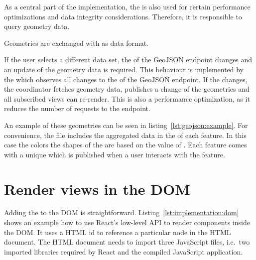 As a central part of the implementation, the  is also used for certain performance optimizations and data integrity considerations.
Therefore, it is responsible to query geometry data.

Geometries are exchanged with \footnotemark as data format.

If the user selects a different data set, the  of the GeoJSON endpoint changes and an update of the geometry data is required.
This behaviour is implemented by the  which observes all changes to the  of the GeoJSON endpoint.
If the  changes, the coordinator fetches geometry data, publishes a change of the geometries and all subscribed views can re-render.
This is also a performance optimization, as it reduces the number of requests to the  endpoint.

An example of these geometries can be seen in listing~\ref{lst:geojson:example}.
For convenience, the file includes the aggregated data in the  of each feature.
In this case the colors the shapes of the \tmap{} are based on the value of .
Each feature comes with a unique  which is published when a user interacts with the feature.



\section{Render views in the DOM}

Adding the \gv{} to the DOM is straightforward.
Listing~\ref{lst:implementation:dom} shows an example how to use React's low-level API to render components inside the DOM.
It uses a HTML id  to reference a particular node in the HTML document.
The HTML document needs to import three JavaScript files, i.e.\ two imported libraries required by React and the compiled JavaScript application.



